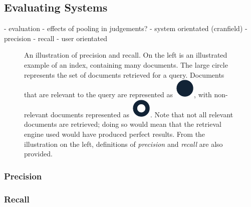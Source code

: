 \subsection{Evaluating Systems}\label{sec:ir_background:evaluation}
- evaluation
    - effects of pooling in judgements?
    - system orientated (cranfield)
        - precision
        - recall
    - user orientated
    
\begin{figure}[t!]
    \centering
    \caption[Precision and recall]{An illustration of precision and recall. On the left is an illustrated example of an index, containing many documents. The large circle represents the set of documents retrieved for a query. Documents that are relevant to the query are represented as~\includegraphics[height=\fontcharht\font`\d]{figures/ch2-pr-r.pdf}, with non-relevant documents represented as~\includegraphics[height=\fontcharht\font`\d]{figures/ch2-pr-nr.pdf}. Note that not all relevant documents are retrieved; doing so would mean that the retrieval engine used would have produced perfect results. From the illustration on the left, definitions of \emph{precision} and \emph{recall} are also provided.}
    \label{fig:pr}
\end{figure}

\subsubsection{Precision}

\subsubsection{Recall}

